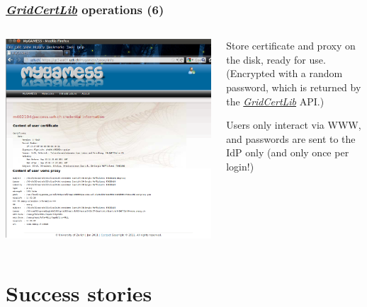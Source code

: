 \documentclass{beamer}
\newcommand{\+}{\vspace{1em}}
\newcommand{\GridCertLib}{\href{http://gridcertlib.googlecode.com/}{{\em GridCertLib}}}
\begin{document}
\begin{frame}
  \frametitle{\GridCertLib{} operations (6)}
  \begin{columns}
    \begin{column}{0.45\textwidth}
      \includegraphics[width=\linewidth]{mygamess}
    \end{column}
    \begin{column}{0.55\textwidth}
      \begin{center}
        Store certificate and proxy on the disk, ready for use.
        \\
        {\footnotesize (Encrypted with a random password, which is
          returned by the \GridCertLib{} API.)}
      
        \+ {Users only interact via WWW, and
          passwords are sent to the IdP only (and only once per
          login!)}
      \end{center}
    \end{column}
  \end{columns}
\end{frame}


\section[Implementation]{Success stories}
\end{document}
